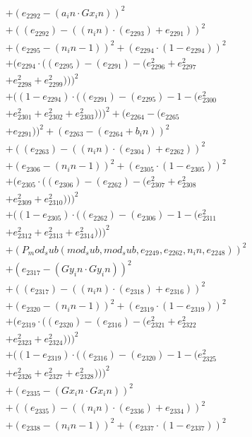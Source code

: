 \documentclass[10pt, a4paper]{article}
\begin{document}
\begin{align*}
& + (e_{2292} - (a_in  \cdot  Gx_in))^{2} \\
& + ((e_{2292}) - ((n_in)  \cdot  (e_{2293}) + e_{2291}))^{2} \\
& + (e_{2295} - (n_in - 1))^{2} + (e_{2294}  \cdot  (1 - e_{2294}))^{2} \\
& + (e_{2294}  \cdot  ((e_{2295}) - (e_{2291}) - (e_{2296}^{2} + e_{2297}^{2} \\
& + e_{2298}^{2} + e_{2299}^{2})))^{2} \\
& + ((1 - e_{2294})  \cdot  ((e_{2291}) - (e_{2295}) - 1 - (e_{2300}^{2} \\
& + e_{2301}^{2} + e_{2302}^{2} + e_{2303}^{2})))^{2} + (e_{2264} - (e_{2265} \\
& + e_{2291}))^{2} + (e_{2263} - (e_{2264} + b_in))^{2} \\
& + ((e_{2263}) - ((n_in)  \cdot  (e_{2304}) + e_{2262}))^{2} \\
& + (e_{2306} - (n_in - 1))^{2} + (e_{2305}  \cdot  (1 - e_{2305}))^{2} \\
& + (e_{2305}  \cdot  ((e_{2306}) - (e_{2262}) - (e_{2307}^{2} + e_{2308}^{2} \\
& + e_{2309}^{2} + e_{2310}^{2})))^{2} \\
& + ((1 - e_{2305})  \cdot  ((e_{2262}) - (e_{2306}) - 1 - (e_{2311}^{2} \\
& + e_{2312}^{2} + e_{2313}^{2} + e_{2314}^{2})))^{2} \\
& + (P_mod_sub(mod_sub, mod_sub, e_{2249}, e_{2262}, n_in, e_{2248}))^{2} \\
& + (e_{2317} - (Gy_in  \cdot  Gy_in))^{2} \\
& + ((e_{2317}) - ((n_in)  \cdot  (e_{2318}) + e_{2316}))^{2} \\
& + (e_{2320} - (n_in - 1))^{2} + (e_{2319}  \cdot  (1 - e_{2319}))^{2} \\
& + (e_{2319}  \cdot  ((e_{2320}) - (e_{2316}) - (e_{2321}^{2} + e_{2322}^{2} \\
& + e_{2323}^{2} + e_{2324}^{2})))^{2} \\
& + ((1 - e_{2319})  \cdot  ((e_{2316}) - (e_{2320}) - 1 - (e_{2325}^{2} \\
& + e_{2326}^{2} + e_{2327}^{2} + e_{2328}^{2})))^{2} \\
& + (e_{2335} - (Gx_in  \cdot  Gx_in))^{2} \\
& + ((e_{2335}) - ((n_in)  \cdot  (e_{2336}) + e_{2334}))^{2} \\
& + (e_{2338} - (n_in - 1))^{2} + (e_{2337}  \cdot  (1 - e_{2337}))^{2} \\

\end{align*}
\end{document}
